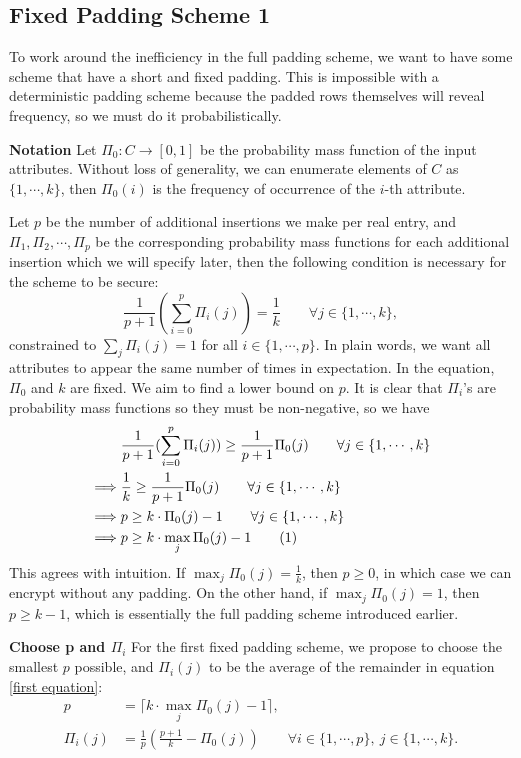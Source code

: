 \documentclass[10pt]{book}
\newcommand\numberthis{\addtocounter{equation}{1}\tag{\theequation}}
\begin{document}
\subsection{Fixed Padding Scheme 1}
To work around the inefficiency in the full padding scheme, we want to have some scheme that have a short and fixed padding. This is impossible with a deterministic padding scheme because the padded rows themselves will reveal frequency, so we must do it probabilistically.

\textbf{Notation} Let $\Pi_0: C \rightarrow [0,1]$ be the probability mass function of the input attributes. Without loss of generality, we can enumerate elements of $C$ as $\{1,\cdots,k\}$, then $\Pi_0(i)$ is the frequency of occurrence of the $i$-th attribute.

Let $p$ be the number of additional insertions we make per real entry, and $\Pi_1, \Pi_2, \cdots, \Pi_p$ be the corresponding probability mass functions for each additional insertion which we will specify later, then the following condition is necessary for the scheme to be secure:
\begin{equation}
	\frac{1}{p+1} (\sum_{i=0}^{p} \Pi_i(j)) = \frac{1}{k} \qquad \forall j \in \{1, \cdots, k\}, \label{first equation}
\end{equation}
constrained to $\sum_{j} \Pi_i(j) = 1$ for all $i \in \{1, \cdots, p\}$. In plain words, we want all attributes to appear the same number of times in expectation. In the equation, $\Pi_0$ and $k$ are fixed. We aim to find a lower bound on $p$. It is clear that $\Pi_i$'s are probability mass functions so they must be non-negative, so we have
\begin{align*}
				& \frac{1}{p+1} (\sum_{i=0}^{p} \Pi_i(j)) \geq \frac{1}{p+1} \Pi_0(j) \qquad \forall j \in \{1, \cdots, k\}	\\
	\implies	& \frac{1}{k} \geq \frac{1}{p+1} \Pi_0(j) \qquad \forall j \in \{1, \cdots, k\}	\\
	\implies 	& p \geq k \cdot \Pi_0(j) - 1 \qquad \forall j \in \{1, \cdots, k\}	\\
	\implies	& p \geq k \cdot \max_{j}{\Pi_0(j)} - 1 \numberthis \label{lb on p}
\end{align*}
This agrees with intuition. If $\max_{j}{\Pi_0(j)} = \frac{1}{k}$, then $p \geq 0$, in which case we can encrypt without any padding. On the other hand, if $\max_{j}{\Pi_0(j)} = 1$, then $p \geq k - 1$, which is essentially the full padding scheme introduced earlier.

\textbf{Choose p and $\Pi_i$} For the first fixed padding scheme, we propose to choose the smallest $p$ possible, and $\Pi_i(j)$ to be the average of the remainder in equation \ref{first equation}:
\begin{align}
	p & = \lceil k \cdot \max_{j}{\Pi_0(j)} - 1 \rceil, \\
	\Pi_i(j) & = \frac{1}{p} \left(\frac{p+1}{k} - \Pi_0(j)\right) \qquad \forall i \in \{1, \cdots, p\}, \  j \in \{1, \cdots, k\}.
\end{align}
\end{document}
